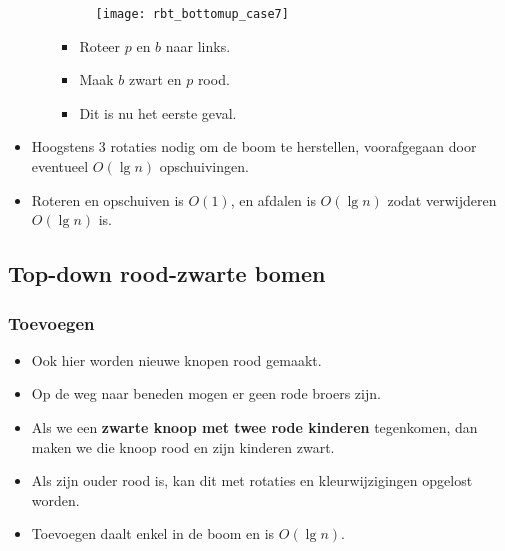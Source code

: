 \begin{itemize}
\begin{enumerate}
        \begin{figure}[ht]
            \centering
            \texttt{[image: rbt\_bottomup\_case7]}
            \caption{}
            \label{fig:rbt_bottomup_case7}
        \end{figure}
        \begin{itemize}
            \item Roteer $p$ en $b$ naar links.
            \item Maak $b$ zwart en $p$ rood.
            \item Dit is nu het eerste geval.
        \end{itemize}
    \end{enumerate}
    \item Hoogstens 3 rotaties nodig om de boom te herstellen, voorafgegaan door eventueel $O(\lg n)$ opschuivingen.
    \item Roteren en opschuiven is $O(1)$, en afdalen is $O(\lg n)$ zodat verwijderen $O(\lg n)$ is.
\end{itemize}


\subsection{Top-down rood-zwarte bomen}
\subsubsection{Toevoegen}
\begin{itemize}
    \item Ook hier worden nieuwe knopen rood gemaakt.
    \item Op de weg naar beneden mogen er geen rode broers zijn.
    \item Als we een \textbf{zwarte knoop met twee rode kinderen} tegenkomen, dan maken we die knoop rood en zijn kinderen zwart.
    \item Als zijn ouder rood is, kan dit met rotaties en kleurwijzigingen opgelost worden.
    \item Toevoegen daalt enkel in de boom en is $O(\lg n)$.
\end{itemize}


